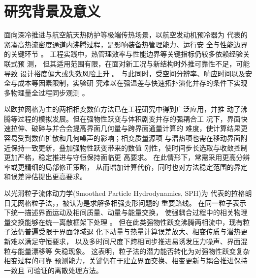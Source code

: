 \section{研究背景及意义}	
面向深冷推进与航空航天热防护等极端传热场景，以航空发动机预冷器为
代表的紧凑高热流密度通道内沸腾过程，是影响装备热管理能力、运行安
全与性能边界的关键环节
。
工程实践中，热管理效率与性能边界等关键指标仍较多依赖经验关联式预
测，
但其适用范围有限，在面对新工况与新结构时外推可靠性不足，可能导致
设计裕度偏大或失效风险上升
。
与此同时，受空间分辨率、响应时间以及安全与成本等因素限制，实验研
究难以在强温差与快速拓扑演化并存的条件下实现多物理量全过程同步观测
。

以欧拉网格为主的两相相变数值方法已在工程研究中得到广泛应用，并推
动了沸腾等过程的模拟发展。但在强物性跃变与体积剧变并存的强耦合工
况下，界面快速拉伸、破碎与并合会提高界面几何量与跨界面通量计算的
难度，使计算结果更容易受到数值扩散和几何噪声的影响；相变质量源项
与潜热项也需在移动界面附近保持一致更新，叠加强物性跃变带来的数值
刚性，使时间步长选取与收敛控制更加严格，稳定推进与守恒保持面临更
高要求。
在此情形下，常需采用更高分辨率或更精细的局部修正策略，
从而增加计算代价，同时也对方法稳定范围的界定和误差评估提出更高要求。

以光滑粒子流体动力学(Smoothed Particle Hydrodynamics, SPH)为
代表的拉格朗日无网格粒子法，，被认为是求解多相强变形问题的
重要路线。
在同一粒子表示下统一描述界面运动及相间质量、动量与能量交换，
使强耦合过程中的相关物理量交换能够在统一离散框架下处理
。
但在此类强物性跃变沸腾两相流中，现有粒子法仍普遍受限于界面邻域退
化下动量与热量计算误差放大、相变传质与潜热更新难以满足守恒要求，
以及多时间尺度下跨相同步推进易诱发压力噪声、界面混粒与能量漂移等
失稳现象。
这表明，粒子法的潜力能否转化为对强物性跃变复杂相变过程的可靠
预测能力，关键仍在于建立界面交换、相变更新与耦合推进保持一致且
可验证的离散处理方法。

